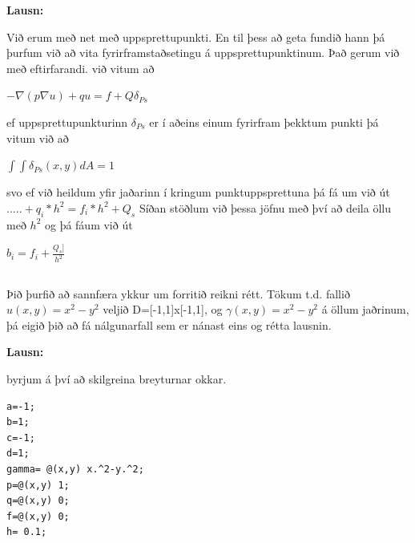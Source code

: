 \documentclass[11pt,a4paper,titlepage]{article}
\begin{document}
\par
\textbf{Lausn:}\par
Við erum með net með uppsprettupunkti.  En til þess að geta fundið hann þá þurfum við að vita fyrirframstaðsetingu á uppsprettupunktinum. 
Það gerum við með eftirfarandi.
við vitum að  
\begin{center}$-\nabla(p \nabla u) + qu= f +Q \delta_{Ps}$ \end{center}
ef uppsprettupunkturinn $\delta_{Ps}$ er í aðeins einum fyrirfram þekktum punkti þá vitum við að 
\begin{center}$\int \int \delta_{Ps}(x,y)dA=1$ \end{center}
 svo ef við heildum yfir jaðarinn í kringum punktuppsprettuna þá fá um við út 
 $.....+q_i*h^2=f_i*h^2+Q_s$
 Síðan stöðlum við þessa jöfnu með því að deila öllu með $h^2$
 og þá fáum við út 
 \begin{center}$b_i= f_i+\frac{Q_s]}{h^2}$\end{center}
\subsection{}
Þið þurfið að sannfæra ykkur um forritið reikni rétt.  Tökum t.d. fallið $u(x,y)=x^2-y^2$ veljið D=[-1,1]x[-1,1], og $\gamma(x,y)=x^2-y^2$ á öllum jaðrinum, þá eigið þið að fá nálgunarfall sem er nánast eins og rétta lausnin.

\par
\textbf{Lausn:}\par
byrjum á því að skilgreina breyturnar okkar. 
\begin{verbatim}
a=-1;
b=1;
c=-1;
d=1;
gamma= @(x,y) x.^2-y.^2;
p=@(x,y) 1;
q=@(x,y) 0;
f=@(x,y) 0;
h= 0.1;
\end{verbatim}
\end{document}
